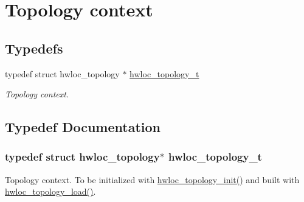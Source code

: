 \hypertarget{group__hwlocality__topology}{
\section{Topology context}
\label{group__hwlocality__topology}
}
\subsection*{Typedefs}
\begin{DoxyCompactItemize}
\item 
typedef struct hwloc\_\-topology $\ast$ \hyperlink{group__hwlocality__topology_ga9d1e76ee15a7dee158b786c30b6a6e38}{hwloc\_\-topology\_\-t}
\begin{DoxyCompactList}\small\item\em Topology context. \item\end{DoxyCompactList}\end{DoxyCompactItemize}


\subsection{Typedef Documentation}
\hypertarget{group__hwlocality__topology_ga9d1e76ee15a7dee158b786c30b6a6e38}{
\subsubsection[{hwloc\_\-topology\_\-t}]{\setlength{\rightskip}{0pt plus 5cm}typedef struct hwloc\_\-topology$\ast$ {\bf hwloc\_\-topology\_\-t}}}
\label{group__hwlocality__topology_ga9d1e76ee15a7dee158b786c30b6a6e38}


Topology context. To be initialized with \hyperlink{group__hwlocality__creation_ga03fd4a16d8b9ee1ffc32b25fd2f6bdfa}{hwloc\_\-topology\_\-init()} and built with \hyperlink{group__hwlocality__creation_gabdf58d87ad77f6615fccdfe0535ff826}{hwloc\_\-topology\_\-load()}. 
